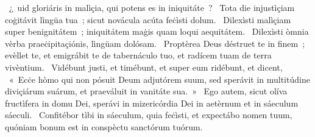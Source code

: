 \psalmChapterWithInscription{}
{  }
{%
~¿~uid gloriáris in malìçia, qui potens es in iniquitáte~? 
~Tota die injustìçiam coġitávit lìngüa tua~; sicut novácula acúta feċìsti dolum. 
~Dilexìsti malìçiam super benignitátem~; iniquitátem maġis quam loqui aequitátem. 
~Dilexìsti òmnia vèrba praeċipitaçiónis, lìngüam dolósam. 
~Proptèrea Deus déstruet te in finem~; evèllet te, et emigrábit te de tabernáculo tuo, et radícem tuam de terra vivèntium. 
~Vidébunt justi, et timébunt, et super eum ridébunt, et dicent, 
~«~Ecċe hòmo qui non pósuit Deum adjutórem suum, sed sperávit in multitúdine diviçiárum suárum, et praeváluit in vanitáte sua.~»
~Ego autem, sicut olíva fructìfera in domu Dei, sperávi in mizericórdia Dei in aetèrnum et in sáeculum sáeculi. 
~Confitébor tìbi in sáeculum, quia feċìsti, et expectábo nomen tuum, quóniam bonum est in conspèctu sanctórum tuórum. 
}
